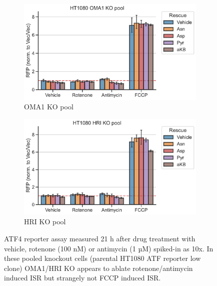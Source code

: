 \begin{figure}
     \centering
     \hspace{0.3\textwidth}
     \begin{subfigure}[b]{0.4\textwidth}
         \centering
         \includegraphics[width=\textwidth]{figures/sapp/ISR/ATF4rep_OMA1pool.pdf}
         \caption{OMA1 KO pool}
         \label{fig:sapp:ISR:ATF4rep_OMA1pool}
     \end{subfigure}
     \hfill
     \begin{subfigure}[b]{0.4\textwidth}
         \centering
         \includegraphics[width=\textwidth]{figures/sapp/ISR/ATF4rep_HRIpool.pdf}
         \caption{HRI KO pool}
         \label{fig:sapp:ISR:ATF4rep_HRIpool}
     \end{subfigure}
     \hspace{0.3\textwidth}
     \hfill
        \caption[ATF4 post mito inhib. OMA1/HRI KO, reporter]{
        ATF4 reporter assay measured 21 h after drug treatment with vehicle, rotenone (100 nM) or antimycin (1 µM) spiked-in as 10x.
        In these pooled knockout cells (parental HT1080 ATF reporter low clone) OMA1/HRI KO appears to ablate rotenone/antimycin induced ISR but strangely not FCCP induced ISR.
        }
        \label{fig:sapp:ISR:ATF4rep_OMA1_HRIpool}
\end{figure}

